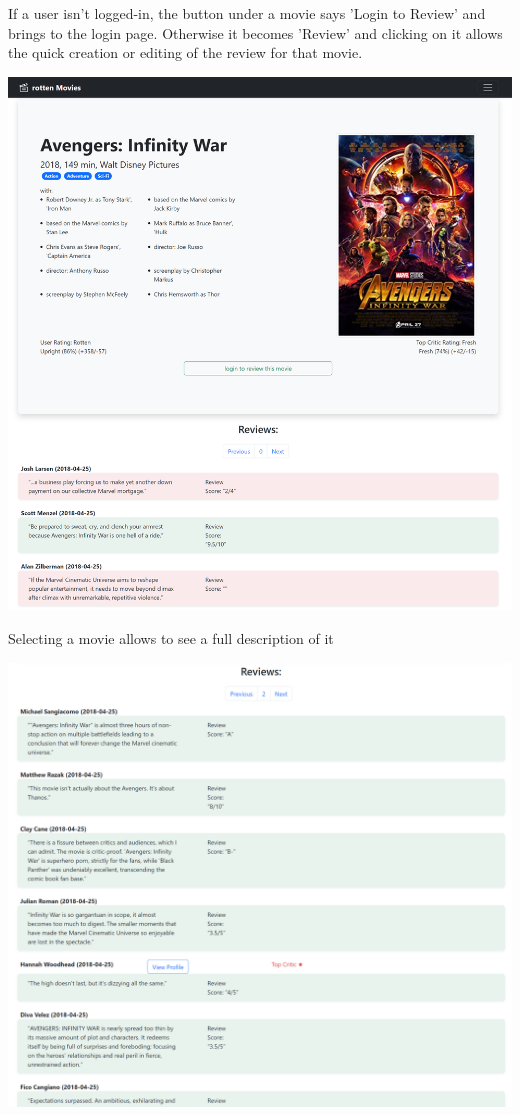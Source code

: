 If a user isn't logged-in, the button under a movie says 'Login to Review' and brings to the login page. Otherwise it becomes 'Review' and clicking on it allows the quick creation or editing of the review for that movie.

\includegraphics[scale=0.45]{../../../images/user_manual/movie_page.png} 

Selecting a movie allows to see a full description of it

\includegraphics[scale=0.45]{../../../images/user_manual/reviews_under_movie.png} 


